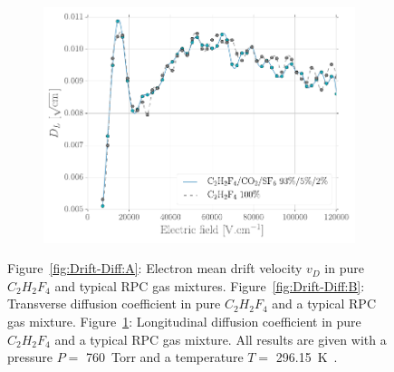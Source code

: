 \begin{figure}[H]
\begin{subfigure}{0.5\linewidth}
			\includegraphics[width = 0.55\plotwidth]{fig/chapt4/Diff_Long.pdf}
			\caption{\label{fig:Drift-Diff:C}}
		\end{subfigure}
		\caption{\label{fig:Drift-Diff} Figure~\ref{fig:Drift-Diff:A}: Electron mean drift velocity $v_D$ in pure $C_2H_2F_4$ and typical RPC gas mixtures. Figure~\ref{fig:Drift-Diff:B}: Transverse diffusion coefficient in pure $C_2H_2F_4$ and a typical RPC gas mixture. Figure~\ref{fig:Drift-Diff:C}: Longitudinal diffusion coefficient in pure $C_2H_2F_4$ and a typical RPC gas mixture. All results are given with a pressure $P = $ \SI{760}{Torr} and a temperature $T =$ \SI{296.15}{K}~\cite{VINCENT2017}.}
	\end{figure}
	
